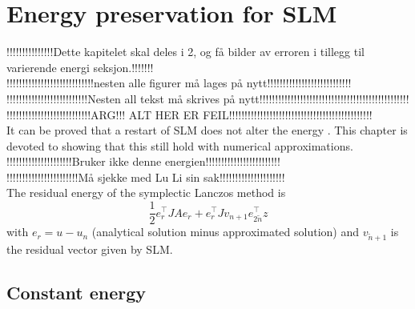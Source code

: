 \chapter{Energy preservation for SLM }
!!!!!!!!!!!!!!!Dette kapitelet skal deles i 2, og få bilder av erroren i tillegg til varierende energi seksjon.!!!!!!!\\
!!!!!!!!!!!!!!!!!!!!!!!!!!!!nesten alle figurer må lages på nytt!!!!!!!!!!!!!!!!!!!!!!!!!!!\\
!!!!!!!!!!!!!!!!!!!!!!!!!!Nesten all tekst må skrives på nytt!!!!!!!!!!!!!!!!!!!!!!!!!!!!!!!!!!!!!!!!!!!!!!!!\\
!!!!!!!!!!!!!!!!!!!!!!!!!!!ARG!!! ALT HER ER FEIL!!!!!!!!!!!!!!!!!!!!!!!!!!!!!!!!!!!!!!!!!!!!!!\\
It can be proved that a restart of SLM does not alter the energy \cite{luli}. This chapter is devoted to showing that this still hold with numerical approximations. \\

!!!!!!!!!!!!!!!!!!!!!Bruker ikke denne energien!!!!!!!!!!!!!!!!!!!!!!!!\\
!!!!!!!!!!!!!!!!!!!!!!!Må sjekke med Lu Li sin sak!!!!!!!!!!!!!!!!!!!!!\\
The residual energy of the symplectic Lanczos method is
\begin{equation}
\frac{1}{2} e_r^{\top} J A e_r + e_r^\top J v_{n+1} e_{2\tilde{n}}^\top z
\end{equation}
with $ e_r = u-u_n $ (analytical solution minus approximated solution) and $v_{\tilde{n}+1}$ is the residual vector given by SLM. 

\section{Constant energy}


